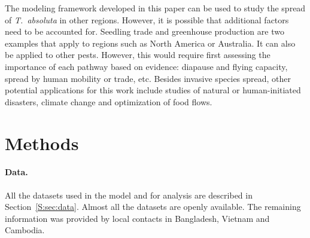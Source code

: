 \documentclass[11pt]{article}
\newcommand{\tuta}{\emph{T.~absoluta}}
\theoremstyle{definition}
\begin{document}
The modeling framework developed in this paper can be used to study the
spread of \tuta{} in other regions. However, it is possible that additional
factors need to be accounted for. Seedling trade and greenhouse production
are two examples that apply to regions such as North America or Australia. 
It can also be applied to other pests. However, this would require first
assessing the importance of each pathway based on evidence: diapause and flying
capacity, spread by human mobility or trade, etc.  Besides invasive species
spread, other potential applications for this work include studies of
natural or human-initiated disasters, climate
change and optimization of food
flows.
 
\section{Methods}
\paragraph{Data.} All the datasets used in the model and for analysis are
described in Section~\ref{S:sec:data}. Almost
all the datasets are openly available. The remaining information was
provided by local contacts in Bangladesh, Vietnam and Cambodia.
\end{document}
